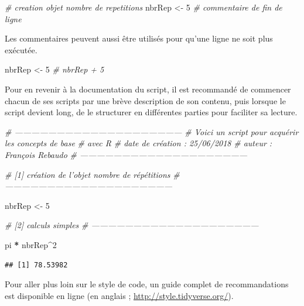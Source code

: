 \documentclass[]{book}
\newenvironment{Shaded}{\begin{snugshade}}{\end{snugshade}}
\newcommand{\CommentTok}[1]{\textcolor[rgb]{0.56,0.35,0.01}{\textit{#1}}}
\newcommand{\DecValTok}[1]{\textcolor[rgb]{0.00,0.00,0.81}{#1}}
\newcommand{\NormalTok}[1]{#1}
\newcommand{\OperatorTok}[1]{\textcolor[rgb]{0.81,0.36,0.00}{\textbf{#1}}}
\newcommand{\StringTok}[1]{\textcolor[rgb]{0.31,0.60,0.02}{#1}}
\begin{document}
\begin{Shaded}
\begin{Highlighting}[]
\CommentTok{# creation objet nombre de repetitions}
\NormalTok{nbrRep <-}\StringTok{ }\DecValTok{5} \CommentTok{# commentaire de fin de ligne}
\end{Highlighting}
\end{Shaded}

Les commentaires peuvent aussi être utilisés pour qu'une ligne ne soit plus exécutée.

\begin{Shaded}
\begin{Highlighting}[]
\NormalTok{nbrRep <-}\StringTok{ }\DecValTok{5}
\CommentTok{# nbrRep + 5}
\end{Highlighting}
\end{Shaded}

Pour en revenir à la documentation du script, il est recommandé de commencer chacun de ses scripts par une brève description de son contenu, puis lorsque le script devient long, de le structurer en différentes parties pour faciliter sa lecture.

\begin{Shaded}
\begin{Highlighting}[]
\CommentTok{# ------------------------------------------------------------}
\CommentTok{# Voici un script pour acquérir les concepts de base }
\CommentTok{# avec R}
\CommentTok{# date de création : 25/06/2018}
\CommentTok{# auteur : François Rebaudo}
\CommentTok{# ------------------------------------------------------------}

\CommentTok{# [1] création de l'objet nombre de répétitions}
\CommentTok{# ------------------------------------------------------------}

\NormalTok{nbrRep <-}\StringTok{ }\DecValTok{5}

\CommentTok{# [2] calculs simples}
\CommentTok{# ------------------------------------------------------------}

\NormalTok{pi }\OperatorTok{*}\StringTok{ }\NormalTok{nbrRep}\OperatorTok{^}\DecValTok{2}
\end{Highlighting}
\end{Shaded}

\begin{verbatim}
## [1] 78.53982
\end{verbatim}

Pour aller plus loin sur le style de code, un guide complet de recommandations est disponible en ligne (en anglais ; \url{http://style.tidyverse.org/}).
\end{document}
